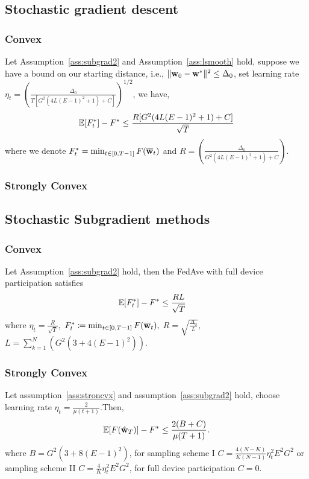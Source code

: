 \subsection{Stochastic gradient descent}
\subsubsection{Convex}
\begin{theorem}
Let Assumption~\ref{ass:subgrad2} and Assumption~\ref{ass:lsmooth} hold, suppose we have a bound 
on our starting distance, i.e., $\|{\mathbf{w}}_{0} - {\mathbf{w}}^*\|^2 \leq \Delta_0$, set learning rate $\eta_t = \left(\frac{\Delta_0}{ T [G^2( 4L(E-1)^2 + 1) + C] }\right)^{1/2}$, we have,
$$\mathbb{E}[ F_t^*] - F^*  \leq \frac{R [G^2( 4L(E-1)^2 + 1) + C] }{\sqrt{T}}$$
where we denote $F^*_t = \min_{t \in [0, T-1]} F({\overline{\mathbf{w}}}_t)$ and $R = \left(\frac{\Delta_0}{ G^2( 4L(E-1)^2 + 1) + C }\right)$.
\label{th:sgdcvxsmth}
\end{theorem}


\subsubsection{Strongly Convex}
\cite{li2019convergence}

\subsection{Stochastic Subgradient methods}

\subsubsection{Convex}
\begin{theorem}
	Let Assumption~\ref{ass:subgrad2} hold, 
	then the FedAve with full device participation satisfies
	\begin{align}
		 \mathbb{E}[F^*_t] - F^* &\leq \frac{RL}{\sqrt{T}}
	\end{align}
	where $\eta_t = \frac{R}{\sqrt{T}},$
	$F^*_t \coloneqq \min_{t \in [0, T-1]} F(\overline{{\mathbf{w}}}_t),$
	$R = \sqrt{ \frac{\Delta_0}{L}},$
	$L=\sum_{k=1}^N \left( G^2 \left(3 + 4(E-1)^2\right)\right).$
	\label{th:cvxnonsmoth}
\end{theorem}


\subsubsection{Strongly Convex}
\begin{theorem}
	Let assumption~\ref{ass:stroncvx} and assumption~\ref{ass:subgrad2} hold, choose learning rate $\eta_t = \frac{2}{\mu(t+1)} $.Then,
	\begin{align}
		\mathbb{E}[F(\hat{{\mathbf{w}}}_T)] - F^* \leq \frac{2(B + C)}{\mu(T+1)}.
	\end{align}
	where $B =  G^2 (3  + 8 (E-1)^2)$, for sampling scheme I $C =\frac{4(N - K)}{K(N-1)} \eta_t^2 E^2G^2 $ or
sampling scheme II $C = \frac{4}{K} \eta_t^2 E^2G^2$, for full device participation $C= 0$.
\end{theorem}


